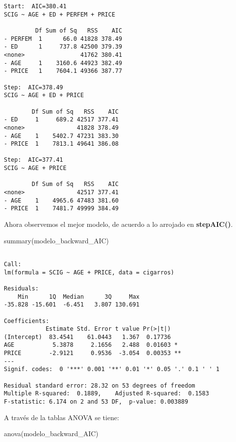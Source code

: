 \documentclass[
  a4paper,
  oneside,
  openany]{book}
\newenvironment{Shaded}{\begin{snugshade}}{\end{snugshade}}
\newcommand{\FunctionTok}[1]{\textcolor[rgb]{0.00,0.00,0.00}{#1}}
\newcommand{\NormalTok}[1]{#1}
\begin{document}
\begin{verbatim}
Start:  AIC=380.41
SCIG ~ AGE + ED + PERFEM + PRICE

         Df Sum of Sq   RSS    AIC
- PERFEM  1      66.0 41828 378.49
- ED      1     737.8 42500 379.39
<none>                41762 380.41
- AGE     1    3160.6 44923 382.49
- PRICE   1    7604.1 49366 387.77

Step:  AIC=378.49
SCIG ~ AGE + ED + PRICE

        Df Sum of Sq   RSS    AIC
- ED     1     689.2 42517 377.41
<none>               41828 378.49
- AGE    1    5402.7 47231 383.30
- PRICE  1    7813.1 49641 386.08

Step:  AIC=377.41
SCIG ~ AGE + PRICE

        Df Sum of Sq   RSS    AIC
<none>               42517 377.41
- AGE    1    4965.6 47483 381.60
- PRICE  1    7481.7 49999 384.49
\end{verbatim}

Ahora observemos el mejor modelo, de acuerdo a lo arrojado en \textbf{stepAIC()}.

\begin{Shaded}
\begin{Highlighting}[]
\FunctionTok{summary}\NormalTok{(modelo\_backward\_AIC)}
\end{Highlighting}
\end{Shaded}

\begin{verbatim}

Call:
lm(formula = SCIG ~ AGE + PRICE, data = cigarros)

Residuals:
    Min      1Q  Median      3Q     Max 
-35.828 -15.601  -6.451   3.807 130.691 

Coefficients:
            Estimate Std. Error t value Pr(>|t|)   
(Intercept)  83.4541    61.0443   1.367  0.17736   
AGE           5.3878     2.1656   2.488  0.01603 * 
PRICE        -2.9121     0.9536  -3.054  0.00353 **
---
Signif. codes:  0 '***' 0.001 '**' 0.01 '*' 0.05 '.' 0.1 ' ' 1

Residual standard error: 28.32 on 53 degrees of freedom
Multiple R-squared:  0.1889,    Adjusted R-squared:  0.1583 
F-statistic: 6.174 on 2 and 53 DF,  p-value: 0.003889
\end{verbatim}

A través de la tablas ANOVA se tiene:

\begin{Shaded}
\begin{Highlighting}[]
\FunctionTok{anova}\NormalTok{(modelo\_backward\_AIC)}
\end{Highlighting}
\end{Shaded}
\end{document}
